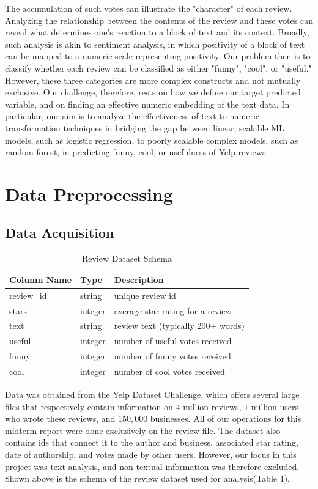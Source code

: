 \documentclass[letterpaper, 12 pt, conference]{ieeeconf}  %
\begin{document}
The accumulation of such votes can illustrate the "character" of each review. Analyzing the relationship between the contents of the review and these votes can reveal what determines one's reaction to a block of text and its context. Broadly, such analysis is akin to sentiment analysis, in which positivity of a block of text can be mapped to a numeric scale representing positivity. Our problem then is to classify whether each review can be classified as either "funny", "cool", or "useful." However, these three categories are more complex constructs and not mutually exclusive. Our challenge, therefore, rests on how we define our target predicted variable, and on finding an effective numeric embedding of the text data. In particular, our aim is to analyze the effectiveness of text-to-numeric transformation techniques in bridging the gap between linear, scalable ML models, such as logistic regression, to poorly scalable complex models, such as random forest, in predicting funny, cool, or usefulness of Yelp reviews.

\section{Data Preprocessing}

\subsection{Data Acquisition}
\begin{table}[h]
	\centering
	\begin{tabular}{l l l}
		\hline
		\textbf{Column Name} & \textbf{Type} & \textbf{Description}\\
		\hline
		review\_id & string & unique review id \\
		stars & integer & average star rating for a review\\
		text & string & review text (typically 200+ words)\\
		useful & integer & number of useful votes received\\
		funny & integer & number of funny votes received\\
		cool & integer & number of cool votes received\\
		\hline
	\end{tabular}
	\caption{Review Dataset Schema}
\end{table}
Data was obtained from the \href{https://www.yelp.com/dataset/challenge}{Yelp Dataset Challenge}, which offers several large files that respectively contain information on $4$ million reviews, $1$ million users who wrote these reviews, and $150,000$ businesses. All of our operations for this midterm report were done exclusively on the review file. The dataset also contains ids that connect it to the author and business, associated star rating, date of authorship, and votes made by other users. However, our focus in this project was text analysis, and non-textual information was therefore excluded. Shown above is the schema of the review dataset used for analysis(Table 1).
\end{document}
